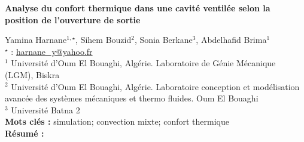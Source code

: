 


    \newpage


%
\begin{flushleft}
\addtocounter{section}{1}
{\Large \textbf{Analyse du confort thermique dans une cavité ventilée selon la position de l'ouverture de sortie}}\label{ref:34}
\end{flushleft}
%
Yamina Harnane$^{1,\star}$, Sihem Bouzid$^{2}$, Sonia Berkane$^{3}$, Abdelhafid Brima$^{1}$\\[2mm]
$^{\star}$ \Letter : \url{harnane_y@yahoo.fr}\\[2mm]
{\footnotesize $^{1}$ Université d'Oum El Bouaghi, Algérie. Laboratoire de Génie Mécanique (LGM), Biskra }\\
{\footnotesize $^{2}$ Université d'Oum El Bouaghi, Algérie. Laboratoire conception et modélisation avancée des systèmes mécaniques et thermo fluides. Oum El Bouaghi}\\
{\footnotesize $^{3}$ Université Batna 2}\\
[4mm]
%
\noindent \textbf{Mots clés : } simulation; convection mixte; confort thermique\\[4mm]
%
\noindent \textbf{Résumé : } 

